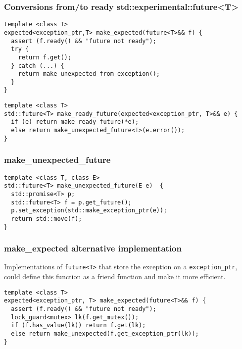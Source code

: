 \documentclass[xcolor=dvipsnames]{beamer}
\newcommand{\cpp}[1]{\lstinline{#1}}
\begin{document}
\begin{frame}[fragile]
\frametitle{Conversions from/to ready std::experimental::future<T> }

\begin{lstlisting}
template <class T>
expected<exception_ptr,T> make_expected(future<T>&& f) {
  assert (f.ready() && "future not ready");
  try {
    return f.get();
  } catch (...) {
    return make_unexpected_from_exception();
  }
}
\end{lstlisting}

\begin{lstlisting}
template <class T>
std::future<T> make_ready_future(expected<exception_ptr, T>&& e) {
  if (e) return make_ready_future(*e);
  else return make_unexpected_future<T>(e.error()); 
}
\end{lstlisting}
\end{frame}

\begin{frame}[fragile]
\frametitle{make\_unexpected\_future }

\begin{lstlisting}
template <class T, class E>
std::future<T> make_unexpected_future(E e)  {
  std::promise<T> p;
  std::future<T> f = p.get_future();
  p.set_exception(std::make_exception_ptr(e));
  return std::move(f);
}
\end{lstlisting}

\end{frame}

\begin{frame}[fragile]
\frametitle{make\_expected alternative implementation }

Implementations of  \cpp{future<T>} that store the exception on a  \cpp{exception_ptr}, could define this function as a friend function and make it more efficient.   

\begin{lstlisting}
template <class T>
expected<exception_ptr, T> make_expected(future<T>&& f) {
  assert (f.ready() && "future not ready");
  lock_guard<mutex> lk(f.get_mutex());
  if (f.has_value(lk)) return f.get(lk);
  else return make_unexpected(f.get_exception_ptr(lk));
}
\end{lstlisting}

\end{frame}
\end{document}
